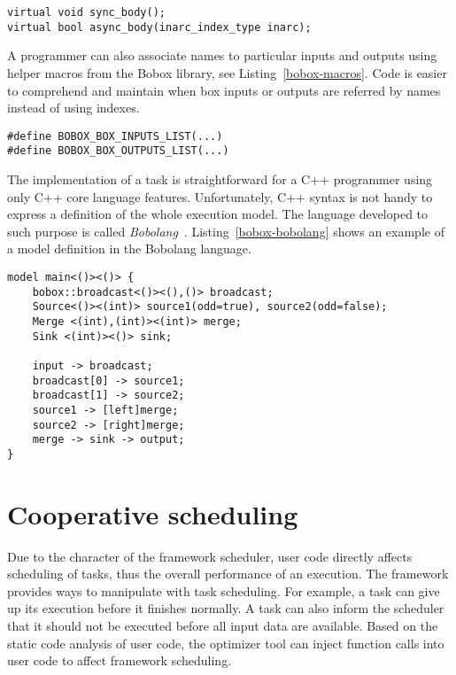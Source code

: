 \begin{lstlisting}[caption={The code representations of the box action step.},label={bobox-action-step}]
virtual void sync_body();
virtual bool async_body(inarc_index_type inarc);
\end{lstlisting}

A programmer can also associate names to particular inputs and outputs using helper macros from the Bobox library, see Listing~\ref{bobox-macros}. Code is easier to comprehend and maintain when box inputs or outputs are referred by names instead of using indexes.

\begin{lstlisting}[caption={Helper macros for mapping of names to inputs and outputs.},label={bobox-macros}]
#define BOBOX_BOX_INPUTS_LIST(...)
#define BOBOX_BOX_OUTPUTS_LIST(...)
\end{lstlisting}

The implementation of a task is straightforward for a C++ programmer using only C++ core language features. Unfortunately, C++ syntax is not handy to express a definition of the whole execution model. The language developed to such purpose is called \emph{Bobolang}~\cite{bobolang}. Listing~\ref{bobox-bobolang} shows an example of a model definition in the Bobolang language.

\begin{lstlisting}[caption={An example of the Bobolang usage.}, label={bobox-bobolang}]
model main<()><()> {
    bobox::broadcast<()><(),()> broadcast;
    Source<()><(int)> source1(odd=true), source2(odd=false);
    Merge <(int),(int)><(int)> merge;
    Sink <(int)><()> sink;
	
    input -> broadcast;
    broadcast[0] -> source1;
    broadcast[1] -> source2;
    source1 -> [left]merge;
    source2 -> [right]merge;
    merge -> sink -> output;
}
\end{lstlisting}

\section{Cooperative scheduling}
Due to the character of the framework scheduler, user code directly affects scheduling of tasks, thus the overall performance of an execution. The framework provides ways to manipulate with task scheduling. For example, a task can give up its execution before it finishes normally. A task can also inform the scheduler that it should not be executed before all input data are available. Based on the static code analysis of user code, the optimizer tool can inject function calls into user code to affect framework scheduling.
